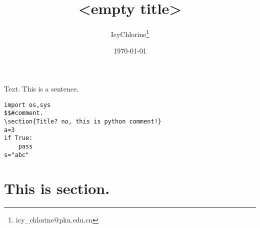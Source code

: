 \documentclass[UTF8]{ctexart}
\title{<empty title>}
\author{IcyChlorine\footnote{icy\_chlorine@pku.edu.cn}}
\date{\today}
\begin{document}
	\maketitle

{\sffamily Text. This is a sentence.}

\begin{lstlisting}
import os,sys
$$#comment.
\section{Title? no, this is python comment!}
a=3
if True:
	pass
s="abc"
\end{lstlisting}



\section{This is section.}
\end{document}
